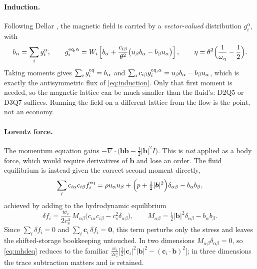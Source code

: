 \documentclass[11pt,a4paper]{article}
\newcommand{\cs}{c_s}
\newcommand{\ci}{\bm{c}_i}
\newcommand{\bb}{\bm{b}}
\begin{document}
\paragraph{Induction.} Following Dellar \cite{dellar2002}, the magnetic field is
carried by a \emph{vector-valued} distribution $g_i^\alpha$, with
\begin{equation}
  b_\alpha = \sum_i g_i^\alpha, \qquad
  g_i^{{\rm eq},\alpha} = W_i\left[b_\alpha
    + \frac{c_{i\beta}}{\theta^2}\big(u_\beta b_\alpha - b_\beta u_\alpha\big)\right],
  \qquad \eta = \theta^2\Big(\frac{1}{\omega_\eta}-\frac12\Big).
  \label{eq:mageq}
\end{equation}
Taking moments gives $\sum_i g_i^{\rm eq} = b_\alpha$ and
$\sum_i c_{i\beta} g_i^{{\rm eq},\alpha} = u_\beta b_\alpha - b_\beta u_\alpha$,
which is exactly the antisymmetric flux of \eqref{eq:induction}. Only that first
moment is needed, so the magnetic lattice can be much smaller than the fluid's:
D2Q5 or D3Q7 suffices. Running the field on a different lattice from the flow is
the point, not an economy.

\paragraph{Lorentz force.} The momentum equation gains
$-\nabla\!\cdot\!\big(\bb\bb-\tfrac12|\bb|^2 I\big)$. This is \emph{not} applied as
a body force, which would require derivatives of $\bb$ and lose an order. The
fluid equilibrium is instead given the correct second moment directly,
\begin{equation}
  \sum_i c_{i\alpha}c_{i\beta} f_i^{\rm eq}
    = \rho u_\alpha u_\beta + \Big(p+\tfrac12|\bb|^2\Big)\delta_{\alpha\beta}
      - b_\alpha b_\beta ,
\end{equation}
achieved by adding to the hydrodynamic equilibrium
\begin{equation}
  \delta f_i = \frac{w_i}{2\cs^4}\,M_{\alpha\beta}
    \big(c_{i\alpha}c_{i\beta} - \cs^2\delta_{\alpha\beta}\big),
  \qquad
  M_{\alpha\beta} = \tfrac12|\bb|^2\delta_{\alpha\beta} - b_\alpha b_\beta .
  \label{eq:mhdeq}
\end{equation}
Since $\sum_i \delta f_i = 0$ and $\sum_i \ci\,\delta f_i = \bm{0}$, this term
perturbs only the stress and leaves the shifted-storage bookkeeping untouched. In
two dimensions $M_{\alpha\beta}\delta_{\alpha\beta}=0$, so \eqref{eq:mhdeq}
reduces to the familiar
$\tfrac{w_i}{2\cs^4}\big[\tfrac12|\ci|^2|\bb|^2-(\ci\!\cdot\!\bb)^2\big]$;
in three dimensions the trace subtraction matters and is retained.
\end{document}
